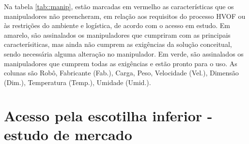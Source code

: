 Na tabela \ref{tab::manip}, estão marcadas em vermelho as características que os
manipuladores não preencheram, em relação aos requisitos do processo HVOF ou às
restrições do ambiente e logística, de acordo com o acesso em estudo. Em
amarelo, são assinalados os manipuladores que cumpriram com as principais
caracterísiticas, mas ainda não cumprem as exigências da solução conceitual,
sendo necessária alguma alteração no manipulador. Em verde, são assinalados os
manipuladores que cumprem todas as exigências e estão pronto para o uso. As
colunas são Robô, Fabricante (Fab.), Carga, Peso, Velocidade (Vel.), Dimensão
(Dim.), Temperatura (Temp.), Umidade (Umid.).
 
\section{Acesso pela escotilha inferior - estudo de
mercado}\label{ape::bighatch}




%	

